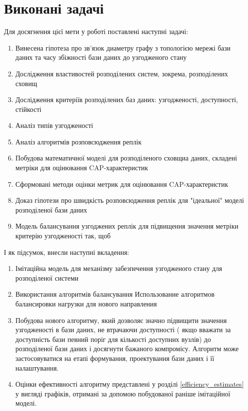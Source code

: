 \documentclass[14pt]{vakthesis}
\begin{document}
 \section{Виконані задачі}
 
 Для досягнення цієї мети у роботі поставлені наступні задачі:

\begin{enumerate}[widest=9999,itemindent=*,leftmargin=0pt]
\item Винесена гіпотеза  про зв'язок диаметру графу з топологією мережі бази даних та часу збіжності бази даних до узгодженого стану
\item Дослідження властивостей розподілених систем, зокрема, розподілених сховищ
\item Дослідження критеріїв розподілених баз даних: узгодженості, доступності, стійкості
\item Аналіз типів узгодженості
\item Аналіз алгоритмів розповсюдження реплік
\item Побудова математичної моделі для розподіленого сховщиа даних, складені  метріки для оцінювання CAP-характеристик
\item Сформовані методи оцінки метрик для оцінювання CAP-характеристик
\item Доказ гіпотези про швидкість розповсюдження реплік для "ідеальної" моделі розподіленої бази даних  
\item Модель балансування узгоджених реплік для підвищення значення метріки критерію узгодженості так, щоб  

\end{enumerate}

І як підсумок, внесли наступні вкладення:

\begin{enumerate}[widest=9999,itemindent=*,leftmargin=0pt]

\item Імітаційна модель для механізму забезпечення узгодженого стану для розподіленої системи
\item Використання алгоритмів балансування  Использование алгоритмов балансировки нагрузки для нового направления
\item Побудова нового алгоритму, який дозволяє значно підвищити значення узгодженості в бази даних, не втрачаючи доступності (
якщо вважати за доступність бази певний поріг для кількості доступних вузлів) до розподіленої бази даних і досягнути бажаного компромісу.
Алгоритм може застосовуватися на етапі формування, проектування бази даних і її налаштування.
\item Оцінки ефективності алгоритму представлені у розділі \ref{efficiency_estimates} у вигляді графіків, отримані за допомою побудованої раніше імітаційної моделі.

\end{enumerate}
\end{document}
